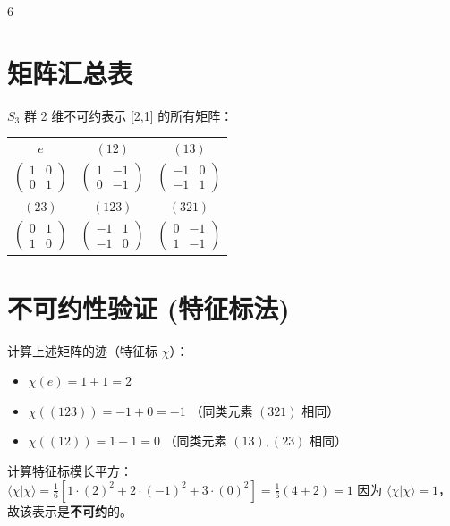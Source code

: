 \documentclass[landscape]{article}
\begin{document}
\begin{multicols*}{6}
\section*{矩阵汇总表}
$S_3$ 群 2 维不可约表示 [2,1] 的所有矩阵：
\begin{center}
\renewcommand{\arraystretch}{1.5}
\begin{tabular}{|c|c|c|}
    \hline
    $e$ & $(12)$ & $(13)$ \\
    $\begin{pmatrix} 1 & 0 \\ 0 & 1 \end{pmatrix}$ & $\begin{pmatrix} 1 & -1 \\ 0 & -1 \end{pmatrix}$ & $\begin{pmatrix} -1 & 0 \\ -1 & 1 \end{pmatrix}$ \\
    \hline
    $(23)$ & $(123)$ & $(321)$ \\
    $\begin{pmatrix} 0 & 1 \\ 1 & 0 \end{pmatrix}$ & $\begin{pmatrix} -1 & 1 \\ -1 & 0 \end{pmatrix}$ & $\begin{pmatrix} 0 & -1 \\ 1 & -1 \end{pmatrix}$ \\
    \hline
\end{tabular}
\end{center}

\section*{不可约性验证 (特征标法)}
计算上述矩阵的迹（特征标 $\chi$）：
\begin{itemize}
    \item $\chi(e) = 1+1 = 2$
    \item $\chi((123)) = -1+0 = -1$ （同类元素 $(321)$ 相同）
    \item $\chi((12)) = 1-1 = 0$ （同类元素 $(13), (23)$ 相同）
\end{itemize}
计算特征标模长平方：
\\
$
\langle \chi | \chi \rangle = \frac{1}{6} \left[ 1 \cdot (2)^2 + 2 \cdot (-1)^2 + 3 \cdot (0)^2 \right] = \frac{1}{6}(4+2) = 1
$
因为 $\langle \chi | \chi \rangle = 1$，故该表示是\textbf{不可约}的。


\end{multicols*}
\end{document}
